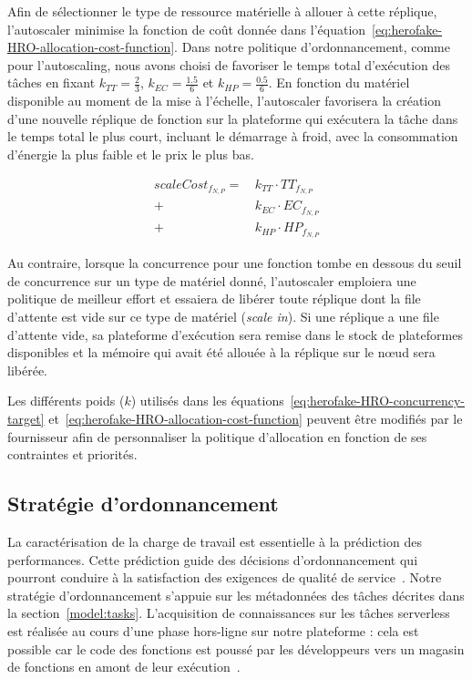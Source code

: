 Afin de sélectionner le type de ressource matérielle à allouer à cette réplique, l'autoscaler minimise la fonction de coût donnée dans l'équation~\ref{eq:herofake-HRO-allocation-cost-function}. Dans notre politique d'ordonnancement, comme pour l'autoscaling, nous avons choisi de favoriser le temps total d'exécution des tâches en fixant $k_{TT} = \frac{2}{3}$, $k_{EC} = \frac{1.5}{6}$ et $k_{HP} = \frac{0.5}{6}$.
En fonction du matériel disponible au moment de la mise à l'échelle, l'autoscaler favorisera la création d'une nouvelle réplique de fonction sur la plateforme qui exécutera la tâche dans le temps total le plus court, incluant le démarrage à froid, avec la consommation d'énergie la plus faible et le prix le plus bas.

\begin{equation}
\begin{split}
    scaleCost_{{f}_{N, P}} = \, &k_{TT} \cdot {TT}_{{f}_{N, P}} \\
    + &k_{EC} \cdot {EC}_{{f}_{N, P}} \\
    + &k_{HP} \cdot {HP}_{{f}_{N, P}}
\end{split}
\label{eq:herofake-HRO-allocation-cost-function}
\end{equation}

Au contraire, lorsque la concurrence pour une fonction tombe en dessous du seuil de concurrence sur un type de matériel donné, l'autoscaler emploiera une politique de meilleur effort et essaiera de libérer toute réplique dont la file d'attente est vide sur ce type de matériel (\textit{scale in}). Si une réplique a une file d'attente vide, sa plateforme d'exécution sera remise dans le stock de plateformes disponibles et la mémoire qui avait été allouée à la réplique sur le nœud sera libérée.

Les différents poids ($k$) utilisés dans les équations~\ref{eq:herofake-HRO-concurrency-target} et~\ref{eq:herofake-HRO-allocation-cost-function} peuvent être modifiés par le fournisseur afin de personnaliser la politique d'allocation en fonction de ses contraintes et priorités.

\subsection{Stratégie d'ordonnancement} \label{section:herofake-scheduling-strategy}

La caractérisation de la charge de travail est essentielle à la prédiction des performances. Cette prédiction guide des décisions d'ordonnancement qui pourront conduire à la satisfaction des exigences de qualité de service~\cite{mampageHolisticViewResource2022}. Notre stratégie d'ordonnancement s'appuie sur les métadonnées des tâches décrites dans la section~\ref{model:tasks}. L'acquisition de connaissances sur les tâches serverless est réalisée au cours d'une phase hors-ligne sur notre plateforme : cela est possible car le code des fonctions est poussé par les développeurs vers un magasin de fonctions en amont de leur exécution~\cite{shahradServerlessWildCharacterizing}.

